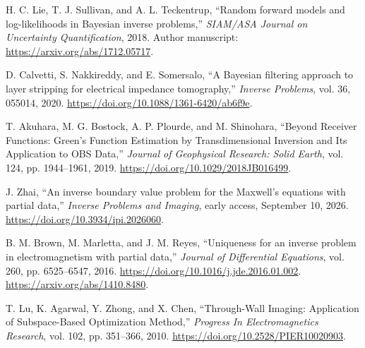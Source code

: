  H. C. Lie, T. J. Sullivan, and A. L. Teckentrup, ``Random forward models and log-likelihoods in Bayesian inverse problems,'' \emph{SIAM/ASA Journal on Uncertainty Quantification}, 2018. Author manuscript: \url{https://arxiv.org/abs/1712.05717}.

 D. Calvetti, S. Nakkireddy, and E. Somersalo, ``A Bayesian filtering approach to layer stripping for electrical impedance tomography,'' \emph{Inverse Problems}, vol. 36, 055014, 2020. \url{https://doi.org/10.1088/1361-6420/ab6f9e}.

 T. Akuhara, M. G. Bostock, A. P. Plourde, and M. Shinohara, ``Beyond Receiver Functions: Green's Function Estimation by Transdimensional Inversion and Its Application to OBS Data,'' \emph{Journal of Geophysical Research: Solid Earth}, vol. 124, pp. 1944--1961, 2019. \url{https://doi.org/10.1029/2018JB016499}.

 J. Zhai, ``An inverse boundary value problem for the Maxwell's equations with partial data,'' \emph{Inverse Problems and Imaging}, early access, September 10, 2026. \url{https://doi.org/10.3934/ipi.2026060}.

 B. M. Brown, M. Marletta, and J. M. Reyes, ``Uniqueness for an inverse problem in electromagnetism with partial data,'' \emph{Journal of Differential Equations}, vol. 260, pp. 6525--6547, 2016. \url{https://doi.org/10.1016/j.jde.2016.01.002}. \url{https://arxiv.org/abs/1410.8480}.

 T. Lu, K. Agarwal, Y. Zhong, and X. Chen, ``Through-Wall Imaging: Application of Subspace-Based Optimization Method,'' \emph{Progress In Electromagnetics Research}, vol. 102, pp. 351--366, 2010. \url{https://doi.org/10.2528/PIER10020903}.
